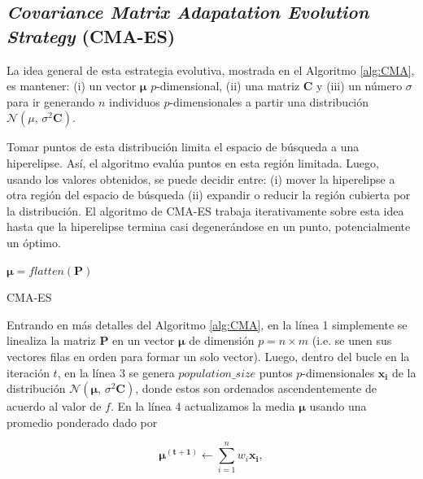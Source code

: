 \subsection{\emph{Covariance Matrix Adapatation Evolution Strategy} (CMA-ES)}\label{sec:cma-es}

La idea general de esta estrategia evolutiva, mostrada en el Algoritmo
\ref{alg:CMA}, es mantener:
(i) un vector $\boldsymbol{\mu}$ $p$-dimensional,
(ii) una matriz $\boldsymbol{C}$ y
(iii) un número $\sigma$ para ir generando $n$ individuos $p$-dimensionales
a partir una distribución $\mathcal{N}(\mu,\,\sigma^{2} \boldsymbol{C})$.


Tomar puntos de esta distribución limita el espacio de búsqueda a una
hiperelipse.
Así, el algoritmo evalúa puntos en esta región limitada.
Luego, usando los valores obtenidos, se puede decidir entre:
(i) mover la hiperelipse a otra región del espacio de búsqueda
(ii) expandir o reducir la región cubierta por la distribución.
El algoritmo de CMA-ES trabaja iterativamente sobre esta idea hasta que la
hiperelipse termina casi degenerándose en un punto, 
potencialmente un óptimo.

\begin{algorithm}
\KwResult{$\boldsymbol{\mu}$}
$\boldsymbol{\mu} = flatten(\boldsymbol{P})$ \\
\caption{CMA-ES}
\label{alg:CMA}
\end{algorithm}


Entrando en más detalles del Algoritmo \ref{alg:CMA},
en la línea 1 simplemente se linealiza la matriz $\boldsymbol{P}$ en un vector $\boldsymbol{\mu}$ 
de dimensión $p = n \times m$ (i.e. se unen sus vectores filas en orden para formar un solo vector).
Luego, dentro del bucle en la iteración $t$, en la línea 3 se genera $population\_size$ puntos
$p$-dimensionales $\boldsymbol{x_i}$ de la distribución $\mathcal{N}(\boldsymbol{\mu},\,\sigma^{2} \boldsymbol{C})$, 
donde estos son ordenados ascendentemente de acuerdo
al valor de $f$.
En la línea 4 actualizamos la media $\boldsymbol{\mu}$ usando una promedio ponderado dado
por

\begin{equation}
  \boldsymbol{\mu^{(t + 1)}} \gets \sum_{i=1}^{n} w_i \boldsymbol{x_i},
\label{cma-average}
\end{equation}

